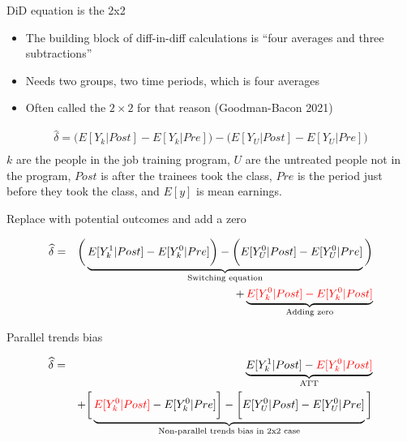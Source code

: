 \documentclass{beamer}
\begin{document}
\begin{frame}{DiD equation is the 2x2}

\begin{itemize}
\item The building block of diff-in-diff calculations is ``four averages and three subtractions''
\item Needs two groups, two time periods, which is four averages
\item Often called the $2 \times 2$ for that reason (Goodman-Bacon 2021)
\end{itemize}

\begin{eqnarray*}
\widehat{\delta} = \bigg ( E[Y_k|Post] - E[Y_k|Pre] \bigg ) - \bigg ( E[Y_U | Post ] - E[ Y_U | Pre] \bigg) \\
\end{eqnarray*}$k$ are the people in the job training program, $U$ are the untreated people not in the program, $Post$ is after the trainees took the class, $Pre$ is the period just before they took the class, and $E[y]$ is mean earnings.

\end{frame}



\begin{frame}{Replace with potential outcomes and add a zero}

\begin{eqnarray*}
\widehat{\delta} &=& \bigg ( \underbrace{E[Y^1_k|Post] - E[Y^0_k|Pre] \bigg ) - \bigg ( E[Y^0_U | Post ] - E[ Y^0_U | Pre]}_{\mathclap{\text{Switching equation}}} \bigg)  \\
&&+ \underbrace{\textcolor{red}{E[Y_k^0 |Post] - E[Y^0_k | Post]}}_{\mathclap{\text{Adding zero}}}
\end{eqnarray*}

\end{frame}

\begin{frame}{Parallel trends bias}

\begin{eqnarray*}
\widehat{\delta} &=& \underbrace{E[Y^1_k | Post] - \textcolor{red}{E[Y^0_k | Post]}}_{\mathclap{\text{ATT}}} \\
&& + \bigg [  \underbrace{\textcolor{red}{E[Y^0_k | Post]} - E[Y^0_k | Pre] \bigg ] - \bigg [ E[Y^0_U | Post] - E[Y_U^0 | Pre] }_{\mathclap{\text{Non-parallel trends bias in 2x2 case}}} \bigg ]
\end{eqnarray*}


\end{frame}
\end{document}
